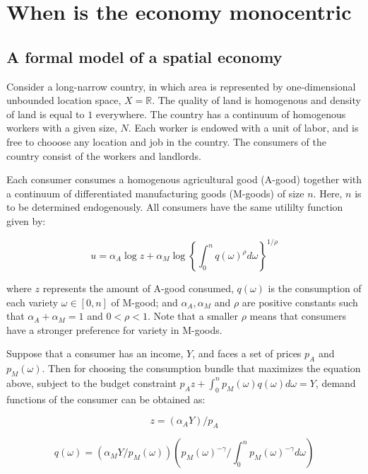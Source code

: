 \chapter{When is the economy monocentric}

\section{A formal model of a spatial economy}

Consider a long-narrow country, in which area is represented by one-dimensional unbounded location space, $X = \mathbb{R}$. The quality of land is homogenous and density of land is equal to $1$ everywhere. The country has a continuum of homogenous workers with a given size, $N$. Each worker is endowed with a unit of labor, and is free to chooose any location and job in the country. The consumers of the country consist of the workers and landlords.

Each consumer consumes a homogenous agricultural good (A-good) together with a continuum of differentiated manufacturing goods (M-goods) of size $n$. Here, $n$ is to be determined endogenously. All consumers have the same utililty function given by:

\begin{equation}
    u = \alpha_A \log z + \alpha_M \log \left\{ \int_0^n q(\omega)^{\rho} d\omega \right\}^{1 / \rho}
\end{equation}

where $z$ represents the amount of A-good consumed, $q(\omega)$ is the consumption of each variety $\omega \in [0, n]$ of M-good; and $\alpha_A, \alpha_M$ and $\rho$ are positive constants such that $\alpha_A + \alpha_M = 1$ and $0 < \rho < 1$. Note that a smaller $\rho$ means that consumers have a stronger preference for variety in M-goods.

Suppose that a consumer has an income, $Y$, and faces a set of prices $p_A$ and $p_M(\omega)$. Then for choosing the consumption bundle that maximizes the equation above, subject to the budget constraint $p_A z + \int_0^n p_M(\omega) q(\omega) d\omega = Y$, demand functions of the consumer can be obtained as:

\begin{equation}
    z = (\alpha_A Y) / p_A
\end{equation}

\begin{equation}
    q(\omega) = (\alpha_M Y / p_M(\omega)) \left(p_M(\omega)^{-\gamma} / \int_0^n p_M(\omega)^{-\gamma} d\omega \right) \label{eq:demand_for_q}
\end{equation}

